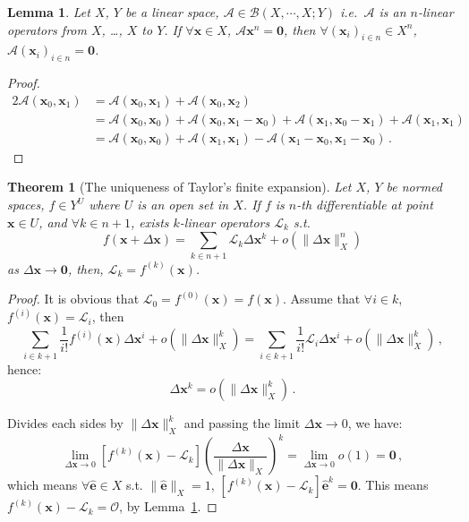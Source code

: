 \documentclass[openany]{book}
\theoremstyle{plain}
\newtheorem{theorem}{Theorem}[section] %
\newtheorem{lemma}{Lemma} %
\theoremstyle{definition}
\newcommand*{\basis}[1]{\hat{\boldsymbol{#1}}} %
\newcommand*{\bv}{\boldsymbol} %
\begin{document}
\begin{lemma}
	\label{lemma: zero symmetric multilinear operator}
	Let $X$, $Y$ be a linear space, $\mathscr A \in \mathcal B(X, \cdots, X; Y)$ i.e.\ $\mathscr A$ is an $n$-linear operators from $X$, \ldots, $X$ to $Y$. 
	If $\forall \bv x \in X$, $\mathscr A \bv x^n = \bv 0$, then $\forall (\bv x_i)_{i \in n} \in X^n$, $\mathscr A(\bv x_i)_{i \in n} = \bv 0$.
\end{lemma}
\begin{proof}
	\begin{align*}
		2 \mathscr A(\bv x_0, \bv x_1) 
			&= \mathscr A(\bv x_0, \bv x_1) + \mathscr A(\bv x_0, \bv x_2)
		\\
			&= \mathscr A(\bv x_0, \bv x_0) + \mathscr A(\bv x_0, \bv x_1 - \bv x_0)
				+ \mathscr A(\bv x_1, \bv x_0 - \bv x_1) + \mathscr A(\bv x_1, \bv x_1)
		\\
			&= \mathscr A(\bv x_0, \bv x_0) + \mathscr A(\bv x_1, \bv x_1) - \mathscr A(\bv x_1 - \bv x_0, \bv x_1 - \bv x_0)\,.
	\end{align*}
\end{proof}

\begin{theorem}[The uniqueness of Taylor's finite expansion]
	Let $X$, $Y$ be normed spaces, $f \in Y^U$ where $U$ is an open set in $X$.
	If $f$ is $n$-th differentiable at point $\bv x \in U$, and $\forall k \in n + 1$, exists $k$-linear operators $\mathscr L_k$ s.t.\ 
	\begin{equation*}
		f(\bv x + \Delta \bv x) = \sum_{k \in n+1} \mathscr L_k \Delta \bv x^k + o(\|\Delta \bv x\|_X^n)
	\end{equation*}
	as $\Delta \bv x \to \bv 0$, then, $\mathscr L_k = f^{(k)}(\bv x)$.
\end{theorem}
\begin{proof}
	It is obvious that $\mathscr L_0 = f^{(0)}(\bv x) = f(\bv x)$. 
	Assume that $\forall i \in k$, $f^{(i)}(\bv x) = \mathscr L_i$, then
	\begin{equation*}
		\sum_{i \in k + 1} \frac{1}{i!} f^{(i)}(\bv x)\Delta \bv x^i + o(\|\Delta \bv x\|_X^k)
		 = \sum_{i \in k + 1} \frac{1}{i!} \mathscr L_i \Delta \bv x^i + o(\|\Delta \bv x\|_X^k)\,,
	\end{equation*}
	hence:
	\begin{equation*}
		[f^{(k)}(\bv x) - \mathscr L_k]\Delta \bv x^k = o(\|\Delta \bv x\|_X^k)\,.
	\end{equation*}

	Divides each sides by $\|\Delta \bv x\|_X^k$ and passing the limit $\Delta \bv x \to 0$, we have:
	\begin{equation*}
		\lim_{\Delta \bv x \to 0} [f^{(k)}(\bv x) - \mathscr L_k] \left( 
			\frac{\Delta \bv x}{\|\Delta \bv x\|_X}
		 \right)^k = \lim_{\Delta \bv x \to 0} o(1) = \bv 0\,,
	\end{equation*}
	which means $\forall \basis e \in X$ s.t. $\|\basis e\|_X = 1$, $[f^{(k)}(\bv x) - \mathscr L_k] \basis e^k = \bv 0$. This means $f^{(k)}(\bv x) - \mathscr L_k = \mathscr O$, by Lemma~\ref{lemma: zero symmetric multilinear operator}.
\end{proof}
\end{document}
